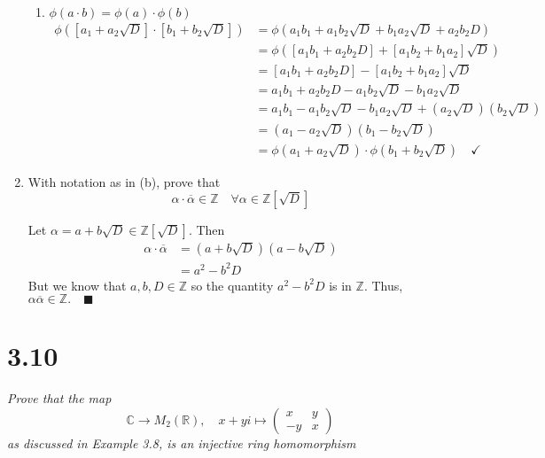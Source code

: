 \documentclass[12pt]{article}
\newcommand{\R}{\mathbb{R}}
\newcommand{\Z}{\mathbb{Z}}
\newcommand{\qed}{\quad \blacksquare}
\newcommand{\C}{\mathbb{C}}
\begin{document}
\begin{enumerate}[label=(\alph*)]
\begin{enumerate}
                \item $\phi(a \cdot b) = \phi(a) \cdot \phi(b)$
                \begin{align*}
                    \phi([a_1 + a_2\sqrt D] \cdot [b_1 + b_2\sqrt D]) &= \phi(a_1b_1 + a_1b_2\sqrt D + b_1a_2\sqrt D + a_2b_2D)\\
                    &= \phi([a_1 b_1 + a_2b_2D] + [a_1b_2 + b_1a_2]\sqrt D)\\
                    &= [a_1 b_1 + a_2b_2D] - [a_1b_2 + b_1a_2]\sqrt D\\
                    &= a_1 b_1 + a_2b_2D - a_1b_2\sqrt D - b_1a_2 \sqrt D\\
                    &= a_1 b_1 - a_1b_2\sqrt D - b_1a_2 \sqrt D + (a_2 \sqrt D)(b_2 \sqrt D)\\
                    &= (a_1 - a_2\sqrt D)(b_1 - b_2\sqrt D)\\
                    &= \phi(a_1 + a_2\sqrt D)\cdot \phi(b_1 + b_2\sqrt D) \quad \checkmark
                \end{align*}
            \end{enumerate}
        \color{black}

        \item With notation as in (b), prove that 
        \[\alpha\cdot \overline \alpha \in \Z \quad \forall \alpha\in \Z[\sqrt D]\]

        \color{blue}
            Let $\alpha = a + b\sqrt D \in \Z[\sqrt D]$. Then 
            \begin{align*}
                \alpha \cdot \overline \alpha &= (a + b\sqrt D)(a - b\sqrt D)\\
                &= a^2 -b^2D
            \end{align*}
            But we know that $a, b, D \in \Z$ so the quantity $a^2 - b^2D$ is in $\Z$. Thus, $\alpha \overline \alpha \in \Z. \qed$
        \color{black}
    \end{enumerate}
\pagebreak

\section*{3.10}
    \emph{Prove that the map}
    \[\C \to M_2(\R), \quad x + yi \mapsto \begin{pmatrix}
        x & y\\
        -y & x
    \end{pmatrix}\]
    \emph{as discussed in Example 3.8, is an injective ring homomorphism}
\end{document}
